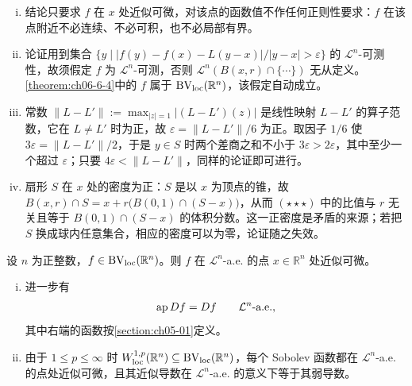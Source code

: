 \documentclass[../../main.tex]{subfiles}%
\begin{document}
\begin{remark}\label{remark:ch06-thm-6-3-条件}
\begin{enumerate}[(i)]
\item 结论只要求 $f$ 在 $x$ 处近似可微，对该点的函数值不作任何正则性要求：$f$ 在该点附近不必连续、不必可积，也不必局部有界。
\item 论证用到集合 $\bigl\{y\mid\lvert f(y)-f(x)-L(y-x)\rvert/\lvert y-x\rvert>\varepsilon\bigr\}$ 的 $\mathcal{L}^n$-可测性，故须假定 $f$ 为 $\mathcal{L}^n$-可测，否则 $\mathcal{L}^n(B(x,r)\cap\{\cdots\})$ 无从定义。\cref{theorem:ch06-6-4}中的 $f$ 属于 $\mathrm{BV}_{\mathrm{loc}}(\mathbb{R}^n)$，该假定自动成立。%
\item 常数 $\lVert L-L'\rVert:=\max_{\lvert z\rvert=1}\lvert(L-L')(z)\rvert$ 是线性映射 $L-L'$ 的算子范数，它在 $L\neq L'$ 时为正，故 $\varepsilon=\lVert L-L'\rVert/6$ 为正。取因子 $1/6$ 使 $3\varepsilon=\lVert L-L'\rVert/2$，于是 $y\in S$ 时两个差商之和不小于 $3\varepsilon>2\varepsilon$，其中至少一个超过 $\varepsilon$；只要 $4\varepsilon<\lVert L-L'\rVert$，同样的论证即可进行。
\item 扇形 $S$ 在 $x$ 处的密度为正：$S$ 是以 $x$ 为顶点的锥，故 $B(x,r)\cap S=x+r\bigl(B(0,1)\cap(S-x)\bigr)$，从而 $(\star\star\star)$ 中的比值与 $r$ 无关且等于 $B(0,1)\cap(S-x)$ 的体积分数。这一正密度是矛盾的来源；若把 $S$ 换成球内任意集合，相应的密度可以为零，论证随之失效。
\end{enumerate}
\end{remark}

\begin{theorem}[$\BV$ 函数与近似可微性]\label{theorem:ch06-6-4}
设 $n$ 为正整数，$f\in\mathrm{BV}_{\mathrm{loc}}(\mathbb{R}^n)$。则 $f$ 在 $\mathcal{L}^n$-a.e. 的点 $x\in\mathbb{R}^n$ 处近似可微。
\end{theorem}

\begin{remark}\label{remark:ch06-thm-6-4-补充}
\begin{enumerate}[(i)]
\item 进一步有
\begin{align*}
\operatorname{ap} Df=Df\qquad\mathcal{L}^n\text{-a.e.},
\end{align*}
其中右端的函数按\cref{section:ch05-01}定义。%
\item 由于 $1\leqslant p\leqslant\infty$ 时 $W^{1,p}_{\mathrm{loc}}(\mathbb{R}^n)\subseteq\mathrm{BV}_{\mathrm{loc}}(\mathbb{R}^n)$，每个 Sobolev 函数都在 $\mathcal{L}^n$-a.e. 的点处近似可微，且其近似导数在 $\mathcal{L}^n$-a.e. 的意义下等于其弱导数。
\end{enumerate}
\end{remark}
\end{document}
